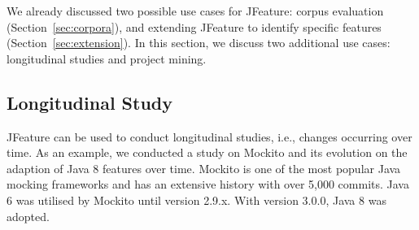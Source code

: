 We already discussed two possible use cases for JFeature: corpus evaluation (Section~\ref{sec:corpora}), and extending JFeature to identify specific features (Section~\ref{sec:extension}). In this section, we discuss two additional use cases: longitudinal studies and project mining.
\subsection{Longitudinal Study}
JFeature can be used to conduct longitudinal studies, i.e., changes occurring over time. As an example, we conducted a study on Mockito and its evolution on the adaption of Java 8 features over time. Mockito is one of the most popular Java mocking frameworks and has an extensive history with over 5,000 commits. Java 6 was utilised by Mockito until version 2.9.x. With version 3.0.0, Java 8 was adopted.
